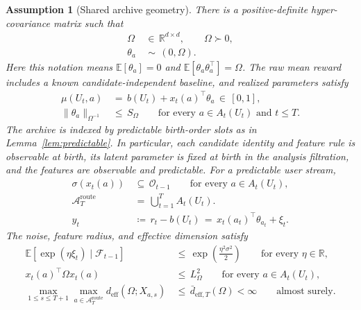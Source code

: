 \documentclass{article} %
\newtheorem{assumption}{Assumption}
\begin{document}
\begin{assumption}[Shared archive geometry]
\label{assump:shared-structure-app}
There is a positive-definite hyper-covariance matrix such that
\begin{align}
\Omega
&\,\in\,
\mathbb R^{d\times d},
\qquad
\Omega\succ0,
\label{eq:hyper-assump-omega}
\\
\theta_a
&\,\sim\,
(0,\Omega).
\label{eq:hyper-assump-random}
\end{align}
Here this notation means $\mathbb E[\theta_a]=0$ and
$\mathbb E[\theta_a\theta_a^\top]=\Omega$. The raw mean reward includes a
known candidate-independent baseline, and realized parameters satisfy
\begin{align}
\mu(U_t,a)
&\,=\,
b(U_t)+x_t(a)^\top\theta_a
\,\in\,
[0,1],
\label{eq:hyper-assump-bounded-mean}
\\
\|\theta_a\|_{\Omega^{-1}}
&\,\leq\,
S_{\Omega}
\qquad
\text{for every \(a\in A_t(U_t)\) and \(t\leq T\)}.
\label{eq:hyper-assump-ellipsoid}
\end{align}
The archive is indexed by predictable birth-order slots as in
Lemma~\ref{lem:predictable}. In particular, each candidate identity and feature
rule is observable at birth, its latent parameter is fixed at birth in the
analysis filtration, and the features are observable and predictable. For a
predictable user stream,
\begin{align}
\sigma(x_t(a))
&\,\subseteq\,
\mathcal O_{t-1}
\qquad
\text{for every \(a\in A_t(U_t)\)},
\label{eq:hyper-assump-predictable}
\\
\mathcal A_T^{\mathrm{route}}
&\,=\,
\bigcup_{t=1}^{T}A_t(U_t).
\label{eq:hyper-route-union}
\\
y_t
&\,\coloneqq\,
r_t-b(U_t)
\,=\,
x_t(a_t)^\top\theta_{a_t}+\xi_t.
\label{eq:hyper-assump-linear}
\end{align}
The noise, feature radius, and effective dimension satisfy
\begin{align}
\mathbb{E}
\!\left[
\exp(\eta\xi_t)\mid\mathcal{F}_{t-1}
\right]
&\,\leq\,
\exp\!\left(\frac{\eta^2\sigma^2}{2}\right)
\qquad
\text{for every \(\eta\in\mathbb R\)},
\label{eq:hyper-assump-subg}
\\
x_t(a)^\top\Omega x_t(a)
&\,\leq\,
L_{\Omega}^2
\qquad
\text{for every \(a\in A_t(U_t)\)},
\label{eq:hyper-assump-radius}
\\
\max_{1\le s\le T+1}\max_{a\in\mathcal A_T^{\mathrm{route}}}
d_{\mathrm{eff}}(\Omega;X_{a,s})
&\,\leq\,
\bar d_{\mathrm{eff},T}(\Omega)
<\infty
\qquad\text{almost surely}.
\label{eq:hyper-assump-small-deff}
\end{align}
\end{assumption}
\end{document}
